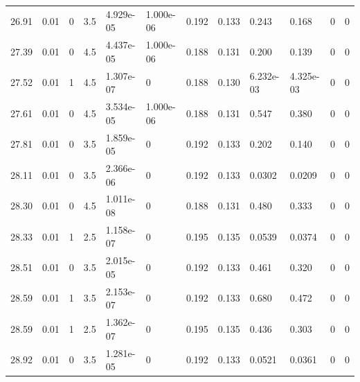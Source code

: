\documentclass[preview]{standalone}
\begin{document}
{{{\begin{tabular}{L{1.2cm}C{1.2cm} C{0.3cm}C{0.5cm} C{1.4cm}C{1.4cm} C{1.4cm}C{1.4cm} C{1.6cm}C{1.6cm} C{1.6cm}C{1.6cm}}
  26.91  &  0.01  & 0     & 3.5 &  4.929e-05  & 1.000e-06  &  0.192&   0.133& 0.243 & 0.168   &  0 & 0  \\ 
  27.39  &  0.01  & 0     & 4.5 &  4.437e-05  & 1.000e-06  &  0.188&   0.131& 0.200 & 0.139   &  0 & 0  \\ 
  27.52  &  0.01  & 1     & 4.5 &  1.307e-07  & 0  &  0.188&   0.130& 6.232e-03 & 4.325e-03   &  0 & 0  \\ 
  27.61  &  0.01  & 0     & 4.5 &  3.534e-05  & 1.000e-06  &  0.188&   0.131& 0.547 & 0.380   &  0 & 0  \\ 
  27.81  &  0.01  & 0     & 3.5 &  1.859e-05  & 0  &  0.192&   0.133& 0.202 & 0.140   &  0 & 0  \\ 
  28.11  &  0.01  & 0     & 3.5 &  2.366e-06  & 0  &  0.192&   0.133& 0.0302 & 0.0209   &  0 & 0  \\ 
  28.30  &  0.01  & 0     & 4.5 &  1.011e-08  & 0  &  0.188&   0.131& 0.480 & 0.333   &  0 & 0  \\ 
  28.33  &  0.01  & 1     & 2.5 &  1.158e-07  & 0  &  0.195&   0.135& 0.0539 & 0.0374   &  0 & 0  \\ 
  28.51  &  0.01  & 0     & 3.5 &  2.015e-05  & 0  &  0.192&   0.133& 0.461 & 0.320   &  0 & 0  \\ 
  28.59  &  0.01  & 1     & 3.5 &  2.153e-07  & 0  &  0.192&   0.133& 0.680 & 0.472   &  0 & 0  \\ 
  28.59  &  0.01  & 1     & 2.5 &  1.362e-07  & 0  &  0.195&   0.135& 0.436 & 0.303   &  0 & 0  \\ 
  28.92  &  0.01  & 0     & 3.5 &  1.281e-05  & 0  &  0.192&   0.133& 0.0521 & 0.0361   &  0 & 0  \\ 
\hline 
\end{tabular} 

}}}
\end{document}

